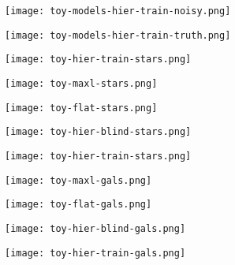 \documentclass{beamer}
\begin{document}
\begin{frame}
\texttt{[image: toy-models-hier-train-noisy.png]}
\end{frame}

\begin{frame}
\texttt{[image: toy-models-hier-train-truth.png]}
\end{frame}

\begin{frame}
\texttt{[image: toy-hier-train-stars.png]}
\end{frame}

\begin{frame}
\texttt{[image: toy-maxl-stars.png]}
\end{frame}

\begin{frame}
\texttt{[image: toy-flat-stars.png]}
\end{frame}

\begin{frame}
\texttt{[image: toy-hier-blind-stars.png]}
\end{frame}

\begin{frame}
\texttt{[image: toy-hier-train-stars.png]}
\end{frame}

\begin{frame}
\texttt{[image: toy-maxl-gals.png]}
\end{frame}

\begin{frame}
\texttt{[image: toy-flat-gals.png]}
\end{frame}

\begin{frame}
\texttt{[image: toy-hier-blind-gals.png]}
\end{frame}

\begin{frame}
\texttt{[image: toy-hier-train-gals.png]}
\end{frame}
\end{document}
